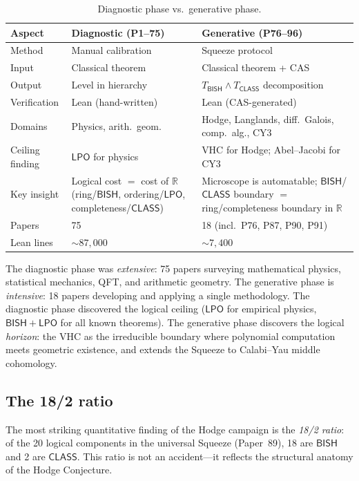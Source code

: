 \documentclass[11pt]{article}
\theoremstyle{plain}
\theoremstyle{definition}
\theoremstyle{remark}
\newcommand{\RR}{\mathbb{R}}
\newcommand{\BISH}{\mathsf{BISH}}
\newcommand{\LPO}{\mathsf{LPO}}
\newcommand{\CLASS}{\mathsf{CLASS}}
\begin{document}
\begin{table}[ht]
\centering
\small
\caption{Diagnostic phase vs.\ generative phase.}\label{tab:phase-comparison}
\begin{tabular}{@{}lll@{}}
\toprule
Aspect & Diagnostic (P1--75) & Generative (P76--96) \\
\midrule
Method & Manual calibration & Squeeze protocol \\
Input & Classical theorem & Classical theorem + CAS \\
Output & Level in hierarchy & $T_{\BISH} \wedge T_{\CLASS}$ decomposition \\
Verification & Lean (hand-written) & Lean (CAS-generated) \\
Domains & Physics, arith.\ geom. & Hodge, Langlands, diff.\ Galois, comp.\ alg., CY3 \\
Ceiling finding & $\LPO$ for physics & VHC for Hodge; Abel--Jacobi for CY3 \\
Key insight & Logical cost $=$ cost of $\RR$ (ring/$\BISH$, ordering/$\LPO$, completeness/$\CLASS$) & Microscope is automatable; $\BISH$/$\CLASS$ boundary $=$ ring/completeness boundary in $\RR$ \\
Papers & 75 & 18 (incl.\ P76, P87, P90, P91) \\
Lean lines & ${\sim}87{,}000$ & ${\sim}7{,}400$ \\
\bottomrule
\end{tabular}
\end{table}

The diagnostic phase was \emph{extensive}: 75 papers surveying
mathematical physics, statistical mechanics, QFT, and arithmetic
geometry.  The generative phase is \emph{intensive}: 18 papers
developing and applying a single methodology.  The diagnostic
phase discovered the logical ceiling ($\LPO$ for empirical physics,
$\BISH + \LPO$ for all known theorems).  The generative phase
discovers the logical \emph{horizon}: the VHC as the irreducible
boundary where polynomial computation meets geometric existence,
and extends the Squeeze to Calabi--Yau middle cohomology.

\subsection{The 18/2 ratio}

The most striking quantitative finding of the Hodge campaign is the
\emph{18/2 ratio}: of the 20 logical components in the universal
Squeeze (Paper~89), 18 are $\BISH$ and 2 are $\CLASS$.  This ratio
is not an accident---it reflects the structural anatomy of the
Hodge Conjecture.
\end{document}
